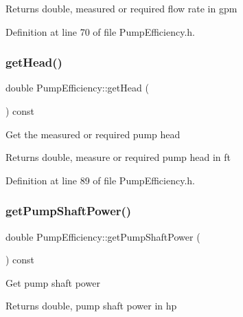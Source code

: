 \begin{DoxyReturn}{Returns}
double, measured or required flow rate in gpm 
\end{DoxyReturn}


Definition at line 70 of file Pump\+Efficiency.\+h.

\mbox{\label{class_pump_efficiency_aa89f7727e67b3e0d20149eee66d10f69}} 
\subsubsection{\texorpdfstring{get\+Head()}{getHead()}}
{\footnotesize\ttfamily double Pump\+Efficiency\+::get\+Head (\begin{DoxyParamCaption}{ }\end{DoxyParamCaption}) const\hspace{0.3cm}{\ttfamily [inline]}}

Get the measured or required pump head

\begin{DoxyReturn}{Returns}
double, measure or required pump head in ft 
\end{DoxyReturn}


Definition at line 89 of file Pump\+Efficiency.\+h.

\mbox{\label{class_pump_efficiency_aeb6d4f2cce565fbe834d71c7a52b87d1}} 
\subsubsection{\texorpdfstring{get\+Pump\+Shaft\+Power()}{getPumpShaftPower()}}
{\footnotesize\ttfamily double Pump\+Efficiency\+::get\+Pump\+Shaft\+Power (\begin{DoxyParamCaption}{ }\end{DoxyParamCaption}) const\hspace{0.3cm}{\ttfamily [inline]}}

Get pump shaft power

\begin{DoxyReturn}{Returns}
double, pump shaft power in hp 
\end{DoxyReturn}


